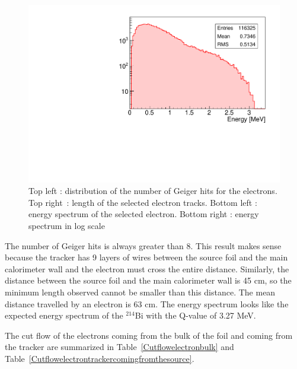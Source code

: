 \documentclass[main.tex]{subfiles}
\begin{document}
\begin{figure}[h!]
\begin{center}
\includegraphics[scale=0.32]{pictures/Chap5/source_selection_surface_energy_log.pdf}
\caption{Top left : distribution of the number of Geiger hits for the electrons. Top right~: length of the selected electron tracks. Bottom left : energy spectrum of the selected electron. Bottom right : energy spectrum in log scale}
\label{electron_gghit_length_time_energy_sss}
\end{center}
\end{figure}


\bigskip


\noindent The number of Geiger hits is always greater than 8. This result makes sense because the tracker has 9 layers of wires between the source foil and the main calorimeter wall and the electron must cross the entire distance. Similarly, the distance between the source foil and the main calorimeter wall is 45 cm, so the minimum length observed cannot be smaller than this distance. The mean distance travelled by an electron is 63 cm. The energy spectrum looks like the expected energy spectrum of the  $^{\text{214}}$Bi with the Q-value of 3.27 MeV.


\bigskip


\noindent The cut flow of the electrons coming from the bulk of the foil and coming from the tracker are summarized in Table~\ref{Cutflowelectronbulk} and Table~\ref{Cutflowelectrontrackercomingfromthesource}.
\end{document}
